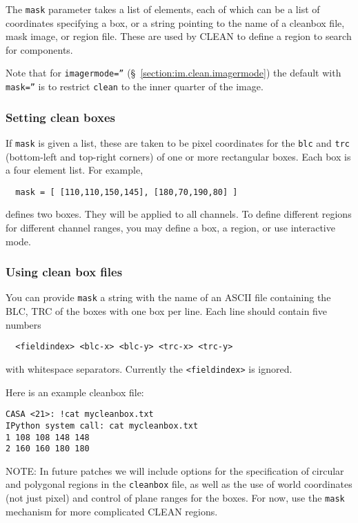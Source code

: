 The {\tt mask} parameter takes a list of elements, each of which can
be a list of coordinates specifying a box,
or a string pointing to the name of a cleanbox file, mask image, or
region file.  These are used by CLEAN to define a region to search for components.  

Note that for {\tt imagermode=''} (\S~\ref{section:im.clean.imagermode}) 
the default with {\tt mask=''} is to restrict {\tt clean} to the inner
quarter of the image.

\subsubsection{Setting clean boxes }
\label{section:im.clean.mask.box}

If {\tt mask} is given a list, these are taken to be pixel
coordinates for the {\tt blc} and {\tt trc} (bottom-left and top-right
corners) of one or more rectangular boxes.  Each box is a four element
list.  For example,
\small
\begin{verbatim}
  mask = [ [110,110,150,145], [180,70,190,80] ]
\end{verbatim}
\normalsize 
defines two boxes. They will be applied to all
channels. To define different regions for different channel ranges, you
may define a box, a region, or use interactive mode.

\subsubsection{Using clean box files}
\label{section:im.clean.mask.boxfiles}

You can provide {\tt mask} a string with the name of  
an ASCII file containing the BLC, TRC of the boxes with one
box per line.  Each line should contain five numbers
\small
\begin{verbatim}
  <fieldindex> <blc-x> <blc-y> <trc-x> <trc-y>
\end{verbatim}
\normalsize
with whitespace separators.  Currently the {\tt <fieldindex>} is 
ignored.

Here is an example cleanbox file:
\small
\begin{verbatim}
CASA <21>: !cat mycleanbox.txt
IPython system call: cat mycleanbox.txt
1 108 108 148 148
2 160 160 180 180
\end{verbatim}
\normalsize

NOTE: In future patches we will include options for the specification
of circular and polygonal regions in the {\tt cleanbox} file, as
well as the use of world coordinates (not just pixel) and control
of plane ranges for the boxes.  For now, use the {\tt mask} mechanism
for more complicated CLEAN regions.

